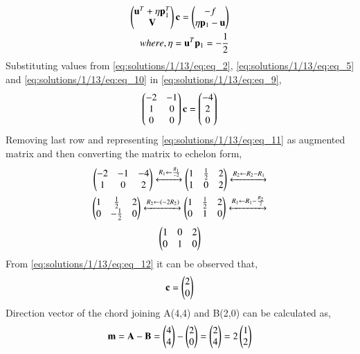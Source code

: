 \begin{align}
    \begin{pmatrix}\mathbf{u}^T+\eta \mathbf{p}_1^T \\ \mathbf{V}\end{pmatrix}\mathbf{c} = \begin{pmatrix}-f \\ \eta \mathbf{p}_1-\mathbf{u}\end{pmatrix} \label{eq:solutions/1/13/eq:eq_9} \\
    where, \eta = \mathbf{u}^T\mathbf{p}_1 = -\frac{1}{2} \label{eq:solutions/1/13/eq:eq_10}
\end{align}
Substituting values from \eqref{eq:solutions/1/13/eq:eq_2}, \eqref{eq:solutions/1/13/eq:eq_5} and \eqref{eq:solutions/1/13/eq:eq_10} in \eqref{eq:solutions/1/13/eq:eq_9}, 
\begin{align}
    \begin{pmatrix}-2 & -1 \\ 1 & 0 \\ 0 & 0\end{pmatrix}\mathbf{c}=\begin{pmatrix}-4 \\ 2 \\ 0\end{pmatrix} \label{eq:solutions/1/13/eq:eq_11}
\end{align}
Removing last row and representing \eqref{eq:solutions/1/13/eq:eq_11} as augmented matrix and then converting the matrix to echelon form,
\begin{align}
    \begin{pmatrix}-2 & -1 & -4 \\ 1 & 0 & 2\end{pmatrix} \xleftrightarrow[]{R_1\leftarrow\frac{R_1}{-2}} \begin{pmatrix}1 & \frac{1}{2} & 2 \\ 1 & 0 & 2\end{pmatrix} \xleftrightarrow[]{R_2\leftarrow R_2-R_1} \nonumber \\
    \begin{pmatrix}1 & \frac{1}{2} & 2 \\ 0 & -\frac{1}{2} & 0\end{pmatrix} \xleftrightarrow[]{R_2\leftarrow(-2R_2)} \begin{pmatrix}1 & \frac{1}{2} & 2 \\ 0 & 1 & 0\end{pmatrix} \xleftrightarrow[]{R_1\leftarrow R_1-\frac{R_2}{2}} \nonumber
\end{align}
\begin{align}
    \begin{pmatrix}1 & 0 & 2 \\ 0 & 1 & 0\end{pmatrix} \label{eq:solutions/1/13/eq:eq_12}
\end{align}
From \eqref{eq:solutions/1/13/eq:eq_12} it can be observed that,
\begin{align}
    \mathbf{c} = \begin{pmatrix}2 \\ 0\end{pmatrix} \label{eq:solutions/1/13/eq:eq_13}
\end{align}
Direction vector of the chord joining A(4,4) and B(2,0) can be calculated as,
\begin{align}
    \mathbf{m} = \mathbf{A} - \mathbf{B} = \begin{pmatrix}4 \\ 4\end{pmatrix} - \begin{pmatrix}2 \\ 0\end{pmatrix} = \begin{pmatrix}2 \\ 4\end{pmatrix} = 2\begin{pmatrix}1 \\ 2\end{pmatrix} \nonumber
\end{align}
